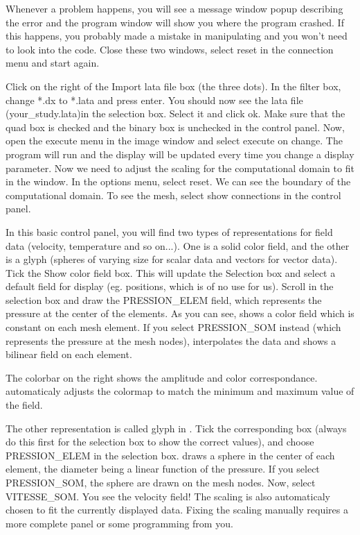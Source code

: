 \documentclass[a4paper,10pt,dvips]{article}
\begin{document}
Whenever a problem happens, you will see a message window popup
describing the error and the program window will show you where the program
crashed. If this happens, you probably made a mistake in manipulating
\opendx and you won't need to look into the code. Close these two
windows, select \textsf{reset} in the \textsf{connection} menu and
start again.

Click on the right of the \textsf{Import lata file} box (the three dots).
In the filter box, change \textsf{*.dx} to \textsf{*.lata} and press enter.
You should now see the lata file (\textsf{your\_study.lata})in the selection box.
Select it and click ok. Make sure that the \textsf{quad} box is checked
and the \textsf{binary} box is unchecked in the control panel.
Now, open the \textsf{execute} menu in the image window and select 
\textsf{execute on change}. The program will run and the display will be
updated every time you change a display parameter. Now we need to adjust
the scaling for the computational domain to fit in the window.
In the \textsf{options} menu, select \textsf{reset}.
We can see the boundary of the computational domain. To see the mesh,
select \textsf{show connections} in the control panel.

In this basic control panel, you will find two types of
representations for field data (velocity, temperature and so on...).
One is a solid color field, and the other is a glyph (spheres of
varying size for scalar data and vectors for vector data).  Tick the
\textsf{Show color field} box. This will update the \textsf{Selection}
box and select a default field for display (eg. \textsf{positions},
which is of no use for us). Scroll in the selection box and draw the
\textsf{PRESSION\_ELEM} field, which represents the pressure at the
center of the elements. As you can see, \opendx shows a color field
which is constant on each mesh element. If you select
\textsf{PRESSION\_SOM} instead (which represents the pressure at the
mesh nodes), \opendx interpolates the data and shows a bilinear field
on each element.

The colorbar on the right shows the amplitude and color correspondance.
\opendx automaticaly adjusts the colormap to match the minimum and maximum
value of the field.

The other representation is called glyph in \opendx. Tick the
corresponding box (always do this first for the selection box to show
the correct values), and choose \textsf{PRESSION\_ELEM} in the
selection box. \opendx draws a sphere in the center of each element,
the diameter being a linear function of the pressure. If you select
\textsf{PRESSION\_SOM}, the sphere are drawn on the mesh nodes. Now,
select \textsf{VITESSE\_SOM}. You see the velocity field! The scaling
is also automaticaly
 chosen to fit the currently displayed data. Fixing
the scaling manually requires a more complete panel or some
programming from you.
\end{document}
